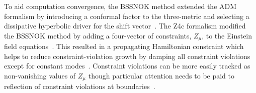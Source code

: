 \documentclass[../Thesis.tex]{subfiles}
\begin{document}
    To aid computation convergence, the BSSNOK method extended the ADM formalism by introducing a conformal factor to the three-metric and selecting a dissipative hyperbolic driver for the  shift vector~\cite{Nakamura1987,Shibata1995,Nakamura1999,Shibata1999,Baumgarte1999,Alcubierre2000,Alcubierre2001}. %
    The Z4c formalism modified the BSSNOK method by adding a four-vector of constraints, $Z_\mu$, to the Einstein field equations~\cite{Bona2003,Bona2004,Gundlach2005,Bernuzzi2010,Hilditch2013}. 
    This resulted in a propagating Hamiltonian constraint which helps to reduce constraint-violation growth by damping all constraint violations  except for constant modes~\cite{Gundlach2005}.
    Constraint violations can be more easily tracked as non-vanishing values of $Z_\mu$ though particular attention needs to be paid to reflection of constraint violations at boundaries~\cite{Bernuzzi2010,Ruiz2011,Hilditch2013}.  \par
    

    
\end{document}
